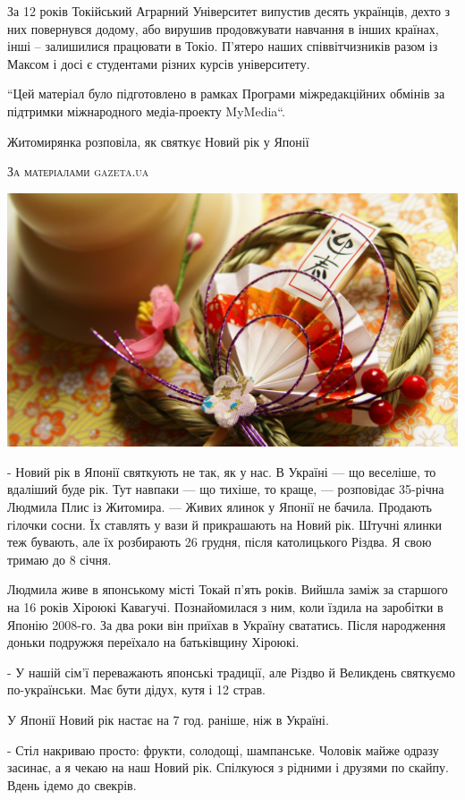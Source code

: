 \documentclass[10pt,a4paper]{article}
\newcommand{\NewsItem}[1]{%
		\usefont{T2A}{iwona}{m}{n} 
		\large #1 \vspace{4pt}
		\par \normalsize \normalfont}
\newcommand{\NewsAuthor}[1]{%
			\hfill \textsc{#1} \vspace{4pt}
			\par \normalfont}
\begin{document}
\begin{multicols}{3}
За 12 років Токійський Аграрний Університет випустив десять українців, дехто з них повернувся додому, або вирушив продовжувати навчання в інших країнах, інші – залишилися працювати в Токіо. П’ятеро наших співвітчизників разом із Максом і досі є студентами різних курсів університету. 

``Цей матеріал було підготовлено в рамках Програми міжредакційних обмінів за підтримки міжнародного медіа-проекту MyMedia``.

\vspace{1cm}

\NewsItem{Житомирянка розповіла, як святкує Новий рік у Японії}
\NewsAuthor{За матеріалами gazeta.ua}
\begin{center}
\includegraphics[width=0.8\linewidth]{images/11}
\end{center}
- Новий рік в Японії святкують не так, як у нас. В Україні — що веселіше, то вдаліший буде рік. Тут навпаки — що тихіше, то краще, — розповідає 35-річна Людмила Плис із Житомира. — Живих ялинок у Японії не бачила. Продають гілочки сосни. Їх ставлять у вази й прикрашають на Новий рік. Штучні ялинки теж бувають, але їх розбирають 26 грудня, після католицького Різдва. Я свою тримаю до 8 січня.

Людмила живе в японському місті Токай п'ять років. Вийшла заміж за старшого на 16 років Хіроюкі Кавагучі. Познайомилася з ним, коли їздила на заробітки в Японію 2008-го. За два роки він приїхав в Україну свататись. Після народження доньки подружжя переїхало на батьківщину Хіроюкі.

- У нашій сім'ї переважають японські традиції, але Різдво й Великдень святкуємо по-українськи. Має бути дідух, кутя і 12 страв.

У Японії Новий рік настає на 7 год. раніше, ніж в Україні.

- Стіл накриваю просто: фрукти, солодощі, шампанське. Чоловік майже одразу засинає, а я чекаю на наш Новий рік. Спілкуюся з рідними і друзями по скайпу. Вдень ідемо до свекрів.


\end{multicols}
\end{document}
